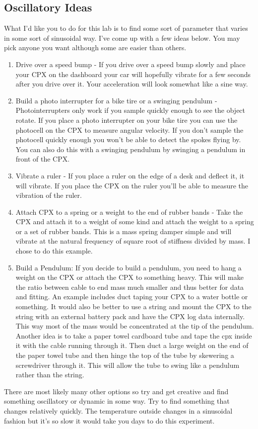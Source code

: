 \subsection{Oscillatory Ideas}

What I’d like you to do for this lab is to find some sort of parameter that varies in some sort of sinusoidal way. I’ve come up with a few ideas below. You may pick anyone you want although some are easier than others.

\begin{enumerate}[itemsep=-5pt]
\item Drive over a speed bump - If you drive over a speed bump slowly and place your CPX on the dashboard your car will hopefully vibrate for a few seconds after you drive over it. Your acceleration will look somewhat like a sine way.
\item Build a photo interrupter for a bike tire or a swinging pendulum - Photointerrupters only work if you sample quickly enough to see the object rotate. If you place a photo interrupter on your bike tire you can use the photocell on the CPX to measure angular velocity. If you don’t sample the photocell quickly enough you won’t be able to detect the spokes flying by. You can also do this with a swinging pendulum by swinging a pendulum in front of the CPX.
\item Vibrate a ruler - If you place a ruler on the edge of a desk and deflect it, it will vibrate. If you place the CPX on the ruler you’ll be able to measure the vibration of the ruler.
\item Attach CPX to a spring or a weight to the end of rubber bands - Take the CPX and attach it to a weight of some kind and attach the weight to a spring or a set of rubber bands. This is a mass spring damper simple and will vibrate at the natural frequency of square root of stiffness divided by mass. I chose to do this example.
\item Build a Pendulum: If you decide to build a pendulum, you need to hang a weight on the CPX or attach the CPX to something heavy. This will make the ratio between cable to end mass much smaller and thus better for data and fitting. An example includes  duct taping your CPX to a water bottle or something. It would also be better to use a string and mount the CPX to the string with an external battery pack and have the CPX log data internally. This way most of the mass would be concentrated at the tip of the pendulum. Another idea is to take a paper towel cardboard tube and tape the cpx inside it with the cable running through it. Then duct a large weight on the end of the paper towel tube and then hinge the top of the tube by skewering a screwdriver through it. This will allow the tube to swing like a pendulum rather than the string. 
\end{enumerate}
There are most likely many other options so try and get creative and find something oscillatory or dynamic in some way. Try to find something that changes relatively quickly. The temperature outside changes in a sinusoidal fashion but it’s so slow it would take you days to do this experiment. 

